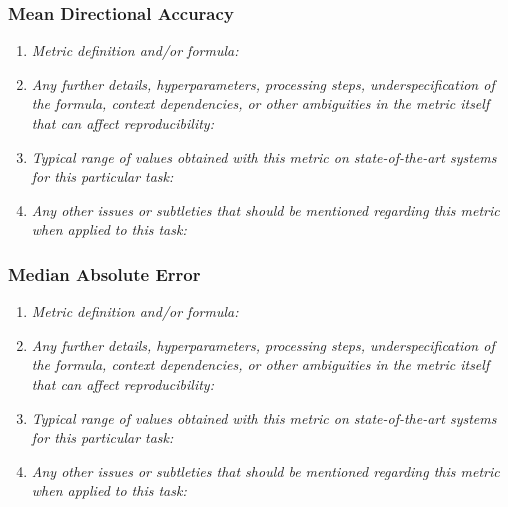 \documentclass[a4paper,11pt]{article}
\begin{document}
        \subsubsection{Mean Directional Accuracy}
            \begin{enumerate}[label=\alph*.]
                \item \textit{Metric definition and/or formula:}
                \bigskip
                \item \textit{Any further details, hyperparameters, processing steps, underspecification of the formula, context dependencies, or other ambiguities in the metric itself that can affect reproducibility:}
                \bigskip
                \item \textit{Typical range of values obtained with this metric on state-of-the-art systems for this particular task:}
                \bigskip
                \item \textit{Any other issues or subtleties that should be mentioned regarding this metric when applied to this task:}
                \bigskip
            \end{enumerate}
        \subsubsection{Median Absolute Error}
            \begin{enumerate}[label=\alph*.]
                \item \textit{Metric definition and/or formula:}
                \bigskip
                \item \textit{Any further details, hyperparameters, processing steps, underspecification of the formula, context dependencies, or other ambiguities in the metric itself that can affect reproducibility:}
                \bigskip
                \item \textit{Typical range of values obtained with this metric on state-of-the-art systems for this particular task:}
                \bigskip
                \item \textit{Any other issues or subtleties that should be mentioned regarding this metric when applied to this task:}
                \bigskip
            \end{enumerate}
\end{document}
